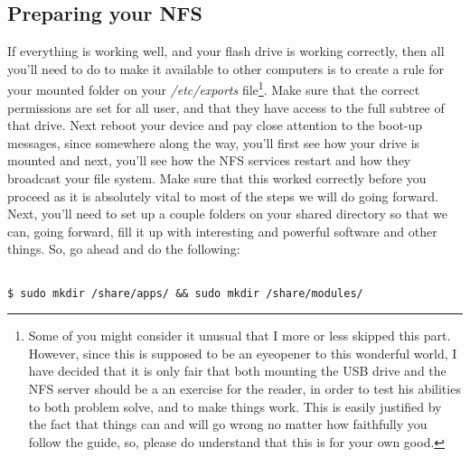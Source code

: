 \documentclass[]{article}
\begin{document}
                                                                 \subsection{Preparing your NFS}
                                                                 If everything is working well, and your flash drive is working correctly, then all you'll need to do to make 
                                                                 it available to other computers is to create a rule for your mounted folder on your \textit{/etc/exports} 
                                                                 file\footnote{Some of you might consider it unusual that I more or less skipped this part. However, since 
                                                                     this is supposed to be an eyeopener to this wonderful world, I have decided that it is only fair that both 
                                                                         mounting the USB drive and the NFS server should be a an exercise for the reader, in order to test his 
                                                                         abilities to both problem solve, and to make things work. This is easily justified by the fact that things 
                                                                         can and will go wrong no matter how faithfully you follow the guide, so, please do understand that this is 
                                                                         for your own good.}. Make sure that the correct permissions are set for all user, and that they have access 
                                                                         to the full subtree of that drive. Next reboot your device and pay close attention to the boot-up messages, 
                                                                         since somewhere along the way, you'll first see how your drive is mounted and next, you'll see how the NFS 
                                                                         services restart and how they broadcast your file system. Make sure that this worked correctly before you 
                                                                         proceed as it is absolutely vital to most of the steps we will do going forward. \\

                                                                         Next, you'll need to set up a couple folders on your shared directory so that we can, going forward, fill it 
                                                                         up with interesting and powerful software and other things. So, go ahead and do the following:
                                                                         \begin{lstlisting}
                                                                         $ sudo mkdir /share/apps/ && sudo mkdir /share/modules/
                                                                         \end{lstlisting}
\end{document}
